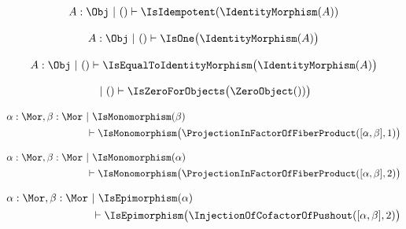 \begin{sequent}
\begin{align*}
  A:\Obj ~|~ () \vdash \IsIdempotent( \IdentityMorphism( A ) )
\end{align*}
\end{sequent}

\begin{sequent}
 \begin{align*}
  A:\Obj ~|~ () \vdash \IsOne\big( \IdentityMorphism( A ) \big)
 \end{align*}
\end{sequent}

\begin{sequent}
 \begin{align*}
  A:\Obj ~|~ () \vdash \IsEqualToIdentityMorphism\big( \IdentityMorphism( A ) \big)
 \end{align*}
\end{sequent}

\begin{sequent}
 \begin{align*}
   ~|~ () \vdash \IsZeroForObjects\big( \ZeroObject() ) \big)
 \end{align*}
\end{sequent}

\begin{sequent}
\begin{align*}
  \alpha:\Mor, \beta:\Mor  ~&|~ \IsMonomorphism( \beta ) \\
  &\vdash \IsMonomorphism\big( \ProjectionInFactorOfFiberProduct( [\alpha, \beta], 1 ) \big)
\end{align*}
\end{sequent}

\begin{sequent}
\begin{align*}
  \alpha:\Mor, \beta:\Mor ~&|~ \IsMonomorphism( \alpha ) \\
  &\vdash \IsMonomorphism\big( \ProjectionInFactorOfFiberProduct( [\alpha, \beta], 2 ) \big)
\end{align*}
\end{sequent}

\begin{sequent}
\begin{align*}
  \alpha:\Mor, \beta:\Mor ~&|~ \IsEpimorphism( \alpha ) \\
  &\vdash \IsEpimorphism\big( \InjectionOfCofactorOfPushout( [\alpha, \beta], 2 ) \big)
\end{align*}
\end{sequent}

